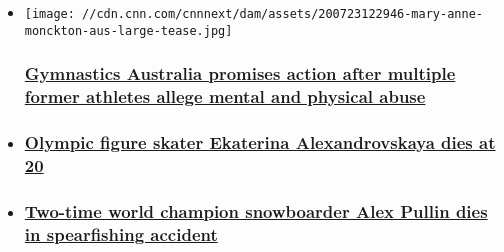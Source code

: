 \begin{itemize}
\item
  \href{/2020/07/23/sport/gymnastics-australia-action-abuse-athletes-spt-intl/index.html}{}

  \texttt{[image: //cdn.cnn.com/cnnnext/dam/assets/200723122946-mary-anne-monckton-aus-large-tease.jpg]}

  \hypertarget{gymnastics-australia-promises-action-after-multiple-former-athletes-allege-mental-and-physical-abuse-}{%
  \subsubsection{\texorpdfstring{\href{/2020/07/23/sport/gymnastics-australia-action-abuse-athletes-spt-intl/index.html}{Gymnastics
  Australia promises action after multiple former athletes allege mental
  and physical abuse
  }}{Gymnastics Australia promises action after multiple former athletes allege mental and physical abuse }}\label{gymnastics-australia-promises-action-after-multiple-former-athletes-allege-mental-and-physical-abuse-}}
\item
  \hypertarget{olympic-figure-skater-ekaterina-alexandrovskaya-dies-at-20}{%
  \subsubsection{\texorpdfstring{\href{/2020/07/18/sport/ekaterina-alexandrovskaya-dead-trnd/index.html}{Olympic
  figure skater Ekaterina Alexandrovskaya dies at
  20}}{Olympic figure skater Ekaterina Alexandrovskaya dies at 20}}\label{olympic-figure-skater-ekaterina-alexandrovskaya-dies-at-20}}
\item
  \hypertarget{two-time-world-champion-snowboarder-alex-pullin-dies-in-spearfishing-accident}{%
  \subsubsection{\texorpdfstring{\href{/2020/07/08/sport/alex-pullin-australia-death-scli-spt-intl/index.html}{Two-time
  world champion snowboarder Alex Pullin dies in spearfishing
  accident}}{Two-time world champion snowboarder Alex Pullin dies in spearfishing accident}}\label{two-time-world-champion-snowboarder-alex-pullin-dies-in-spearfishing-accident}}
\end{itemize}

